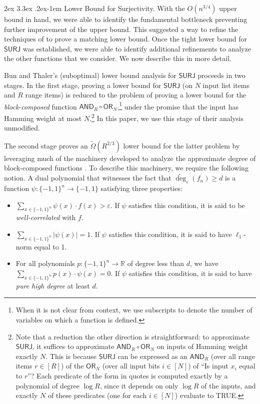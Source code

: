 \documentclass[11pt, letterpaper, fleqn]{article}
\makeatletter
\newcommand{\para}{
  \@startsection{paragraph}{4}
  {\z@}{2ex \@plus 3.3ex \@minus .2ex}{-1em}
  {\normalfont\normalsize\bfseries}
}
\theoremstyle{plain}
\newcommand{\R}{\mathbb{R}}
\newcommand{\SURJ}{\mathsf{ SURJ}}
\newcommand{\OR}{\mathsf{ OR}}
\newcommand{\bits}{\{-1,1\}}
\newcommand{\eps}{\varepsilon}
\newcommand{\adeg}{\widetilde{\operatorname{deg}}}
\newcommand{\AND}{\mathsf{AND}}
\makeatother
\begin{document}
\para{Lower Bound for Surjectivity.}
With the $O(n^{3/4})$ upper bound in hand, we were able
to identify the fundamental bottleneck
preventing further improvement of the upper bound. 
This suggested 
a way to refine the techniques of \cite{adegsurj} to
prove a matching lower bound. Once the tight lower bound
for $\SURJ$ was established, we were able to identify additional refinements
to analyze the other functions that we consider. We now describe this in more detail.

Bun and Thaler's \cite{adegsurj} (suboptimal) lower bound analysis for $\SURJ$ proceeds in two stages.
In the first stage, proving a lower bound for $\SURJ$ (on $N$ input list items and $R$ range items) is reduced to the problem
of proving a lower bound for the \emph{block-composed} function $\AND_R \circ \OR_N$,\footnote{When
it is not clear from context, we use subscripts to denote the number of variables on which a function is defined.} under the promise that the input has Hamming weight at most $N$.\footnote{Note that a reduction the other direction is straightforward: 
to approximate $\SURJ$, it suffices to approximate 
$\AND_R \circ \OR_N$ on inputs of Hamming weight exactly $N$. This is because
$\SURJ$ can be expressed as an $\AND_R$ (over all range items $r\in [R]$) of the $\OR_N$ (over all input bits $i\in[N]$) of ``Is input $x_i$ equal to $r$''? Each predicate of the form in quotes is computed exactly by a polynomial of degree $\log R$, since
it depends on only $\log R$ of the inputs, and exactly $N$ of these predicates (one for each $i \in [N]$)
evaluate to TRUE.}
In this paper, we use this stage of their analysis unmodified.

The second stage proves an $\tilde{\Omega}(R^{2/3})$ lower bound for the latter problem by leveraging much of the machinery developed to analyze the approximate degree of block-composed functions \cite{bt13, sherstovandor, razborovsherstov}. 
To describe this machinery, we require the following notion.
A dual polynomial that witnesses the fact that $\adeg_{\eps}(f_n) \geq d$ is a 
function $\psi \colon \bits^n \to \bits$ satisfying three properties:
\begin{itemize}
\item $\sum_{x \in \bits^n}\psi(x) \cdot f(x) > \eps$. If $\psi$ satisfies this condition, it is said to be \emph{well-correlated} with $f$.
\item  $\sum_{x \in \bits^n} |\psi(x)| = 1$. If $\psi$ satisfies this condition, it is said to have $\ell_1$-norm equal to 1.
\item For all polynomials $p \colon \bits^n \to \R$ of degree less than $d$, we have $\sum_{x \in \bits^n} p(x) \cdot \psi(x) = 0$. 
If $\psi$ satisfies this condition, it is said to have \emph{pure high degree} at least $d$.
\end{itemize}
\end{document}
